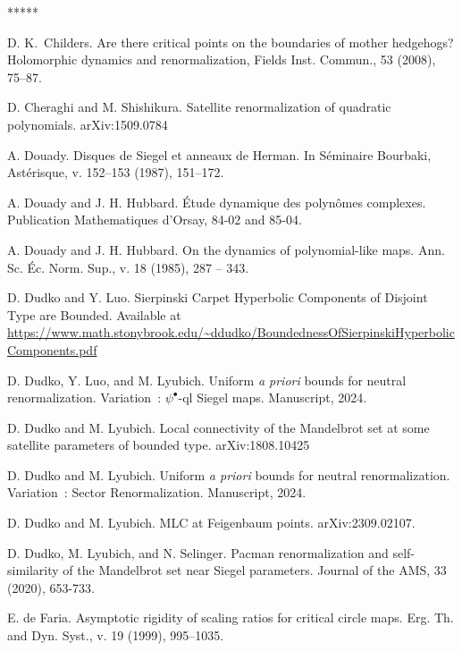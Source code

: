 \documentclass{amsart}
\newcommand{\1}{{\mathbb 1 }}
\theoremstyle{remark}
\numberwithin{equation}{section}
\theoremstyle{definition}
\newcommand{\RN}[1]{\MakeUppercase{\romannumeral#1}}%
\begin{document}
\begin{thebibliography}{*****}
   
  D. K.~Childers. Are there critical points on the boundaries of mother hedgehogs? Holomorphic dynamics and renormalization, Fields Inst. Commun., 53 (2008), 75–87.  


 D. Cheraghi and M. Shishikura. Satellite renormalization of quadratic polynomials. arXiv:1509.0784


 A. Douady. Disques de Siegel et anneaux de Herman. In S\'eminaire Bourbaki,
  Ast\'erisque, v. 152--153 (1987), 151--172. 





 A. Douady and J. H. Hubbard.
  \'{E}tude dynamique des polyn\^{o}mes complexes.
 Publication Mathematiques d'Orsay,
84-02 and 85-04.

 A. Douady and J. H. Hubbard. On the dynamics of polynomial-like maps.
   Ann. Sc. \'{E}c. Norm. Sup., v. 18 (1985), 287 -- 343.


 D. Dudko and Y. Luo. Sierpinski Carpet Hyperbolic Components of Disjoint Type are Bounded. Available at \url{https://www.math.stonybrook.edu/~ddudko/BoundednessOfSierpinskiHyperbolicComponents.pdf}


 D. Dudko, Y. Luo, and M. Lyubich. Uniform \emph{a priori} bounds for neutral renormalization. Variation~\RN{2}: $\psi^\bullet$-ql Siegel maps. Manuscript, 2024.


 D. Dudko and M. Lyubich. Local connectivity of the Mandelbrot set at some satellite parameters of bounded type. arXiv:1808.10425


 D. Dudko and M. Lyubich. Uniform \emph{a priori} bounds for neutral renormalization. Variation~\RN{1}:  Sector Renormalization. Manuscript, 2024.


 D. Dudko and M. Lyubich. MLC at Feigenbaum points. arXiv:2309.02107.



 D. Dudko, M. Lyubich, and N. Selinger. Pacman renormalization and self-similarity of the Mandelbrot set near Siegel parameters. Journal of the AMS, 33 (2020), 653-733.



 E. de Faria.  Asymptotic rigidity of scaling ratios
  for critical circle maps. Erg. Th. and Dyn. Syst., v. 19 (1999),
  995--1035. 
  

\end{thebibliography}
\end{document}
